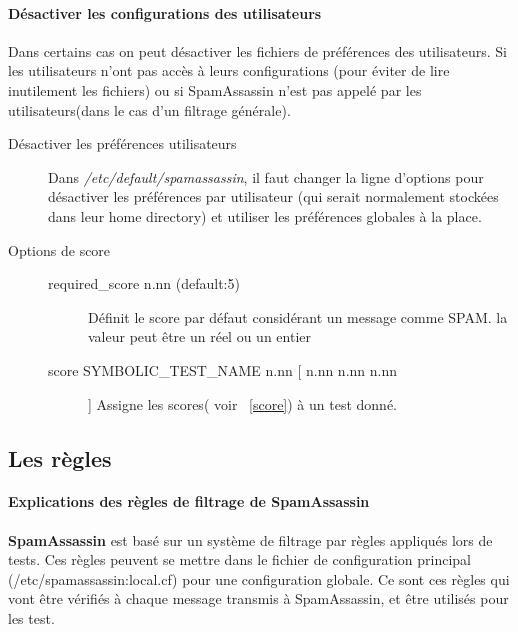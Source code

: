 \documentclass[a4paper,11pt]{article}
\begin{document}
\paragraph{Désactiver les configurations des utilisateurs}
Dans certains cas on peut désactiver les fichiers de préférences des utilisateurs. Si les utilisateurs n'ont pas accès à leurs configurations 
(pour éviter de lire inutilement les fichiers) ou si SpamAssassin n'est pas appelé par les utilisateurs(dans le cas d'un filtrage générale).

\begin{description}
 \item [Désactiver les préférences utilisateurs]Dans \emph{/etc/default/spamassassin}, il faut changer la ligne d'options pour désactiver les préférences par utilisateur (qui serait normalement stockées dans leur home directory) et utiliser les préférences globales à la place. 
 \item [Options de score] \begin{description}
                           \item [required\_score n.nn (default:5)] Définit le score par défaut considérant un message comme SPAM. la valeur peut être un réel ou un entier
                           \item [score SYMBOLIC\_TEST\_NAME n.nn [ n.nn n.nn n.nn ]] Assigne les scores( voir ~\ref{score}) à un test donné.
                          \end{description}

\end{description}
\subsection{Les règles}
\paragraph{Explications des règles de filtrage de SpamAssassin}
\textbf{SpamAssassin} est basé sur un système de filtrage par règles appliqués lors de tests. 
Ces règles peuvent se mettre dans le fichier de configuration principal (/etc/spamassassin:local.cf) pour 
une configuration globale.
Ce sont ces règles qui vont être vérifiés à chaque message transmis à SpamAssassin, et être utilisés pour les test.
\end{document}
